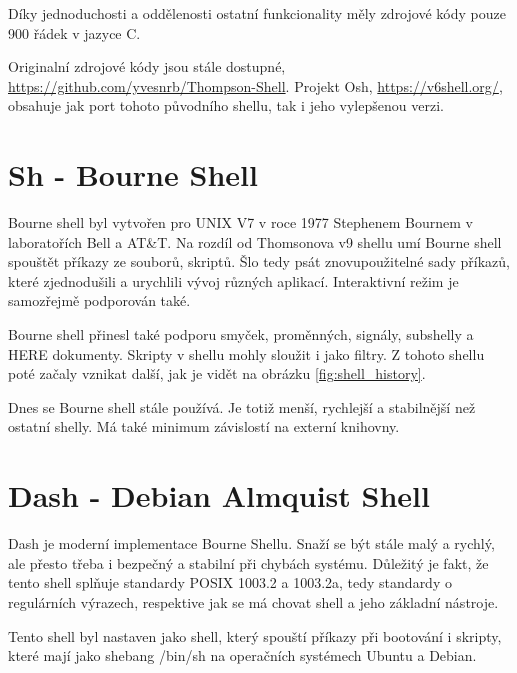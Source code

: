 \documentclass[thesis=M,czech]{FITthesis}[2012/06/26]
\begin{document}
Díky jednoduchosti a oddělenosti ostatní funkcionality měly zdrojové kódy pouze 900 řádek v jazyce C.

Originalní zdrojové kódy jsou stále dostupné, \url{https://github.com/yvesnrb/Thompson-Shell}. Projekt Osh, \url{https://v6shell.org/}, obsahuje jak port tohoto původního shellu, tak i jeho vylepšenou verzi.



%
%
%
\section{Sh - Bourne Shell}

Bourne shell byl vytvořen pro UNIX V7 v roce 1977 Stephenem Bournem v laboratořích Bell a AT\&T. Na rozdíl od Thomsonova v9 shellu umí Bourne shell spouštět příkazy ze souborů, skriptů. Šlo tedy psát znovupoužitelné sady příkazů, které zjednodušili a urychlili vývoj různých aplikací. Interaktivní režim je samozřejmě podporován také.

Bourne shell přinesl také podporu smyček, proměnných, signály, subshelly a HERE dokumenty. Skripty v shellu mohly sloužit i jako filtry. Z tohoto shellu poté začaly vznikat další, jak je vidět na obrázku \ref{fig:shell_history}.

Dnes se Bourne shell stále používá. Je totiž menší, rychlejší a stabilnější než ostatní shelly. Má také minimum závislostí na externí knihovny.

%
%
%
\section{Dash - Debian Almquist Shell}

Dash je moderní implementace Bourne Shellu. Snaží se být stále malý a rychlý, ale přesto třeba i bezpečný a stabilní při chybách systému. Důležitý je fakt, že tento shell splňuje standardy POSIX 1003.2 a 1003.2a, tedy standardy o regulárních výrazech, respektive jak se má chovat shell a jeho základní nástroje.

Tento shell byl nastaven jako shell, který spouští příkazy při bootování i skripty, které mají jako shebang /bin/sh na operačních systémech Ubuntu a Debian.

\end{document}
